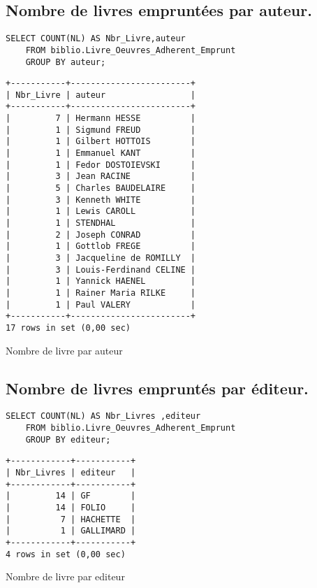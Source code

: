 \documentclass{article}
\begin{document}
\subsection{Nombre de livres empruntées par auteur.}
\begin{listing}[H]
\begin{verbatim}
SELECT COUNT(NL) AS Nbr_Livre,auteur 
	FROM biblio.Livre_Oeuvres_Adherent_Emprunt 
	GROUP BY auteur;
\end{verbatim}
\begin{verbatim}
+-----------+------------------------+
| Nbr_Livre | auteur                 |
+-----------+------------------------+
|         7 | Hermann HESSE          |
|         1 | Sigmund FREUD          |
|         1 | Gilbert HOTTOIS        |
|         1 | Emmanuel KANT          |
|         1 | Fedor DOSTOIEVSKI      |
|         3 | Jean RACINE            |
|         5 | Charles BAUDELAIRE     |
|         3 | Kenneth WHITE          |
|         1 | Lewis CAROLL           |
|         1 | STENDHAL               |
|         2 | Joseph CONRAD          |
|         1 | Gottlob FREGE          |
|         3 | Jacqueline de ROMILLY  |
|         3 | Louis-Ferdinand CELINE |
|         1 | Yannick HAENEL         |
|         1 | Rainer Maria RILKE     |
|         1 | Paul VALERY            |
+-----------+------------------------+
17 rows in set (0,00 sec)	
\end{verbatim}
\caption{Nombre de livre par auteur}
\end{listing}

\subsection{Nombre de livres empruntés par éditeur.}
\begin{listing}[H]
\begin{verbatim}
SELECT COUNT(NL) AS Nbr_Livres ,editeur
	FROM biblio.Livre_Oeuvres_Adherent_Emprunt
	GROUP BY editeur;
\end{verbatim}
\begin{verbatim}
+------------+-----------+
| Nbr_Livres | editeur   |
+------------+-----------+
|         14 | GF        |
|         14 | FOLIO     |
|          7 | HACHETTE  |
|          1 | GALLIMARD |
+------------+-----------+
4 rows in set (0,00 sec)
\end{verbatim}
\caption{Nombre de livre par editeur}
\end{listing}
\end{document}
